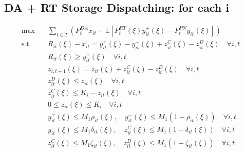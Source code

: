 \documentclass[10pt]{article}
\begin{document}
\newpage

\subsection{DA + RT Storage Dispatching: for each i}
\begin{subequations}
    \begin{align}
    \text{max} \quad &\sum_{t\in T}\left(P_t^{DA}x_{it} + \mathbb{E}\left[P_t^{RT}(\xi)y_{it}^{+}(\xi) - P_t^{PN}y_{it}^{-}(\xi)\right]\right)&\\    
    \text{s.t.} \quad &R_{it}(\xi) - x_{it} = y_{it}^{+}(\xi) - y_{it}^{-}(\xi) + z^C_{it}(\xi) - z^D_{it}(\xi)\quad  \forall i, t &\\ 
    &R_{it}(\xi) \geq y^+_{it}(\xi) \quad \forall i ,t &\\
    &z_{i,t+1}(\xi) = z_{it}(\xi) + z^C_{it}(\xi) - z^D_{it}(\xi) \quad \forall i, t &\\
    &z^D_{it}(\xi) \le z_{it}(\xi) \quad \forall i, t &\\
    &z^C_{it}(\xi) \le K_i-z_{it}(\xi) \quad \forall i, t &\\
    &0 \leq z_{it}(\xi) \leq K_i \quad \forall i, t &\\
    &y^+_{it}(\xi) \leq M_1 \rho_{it}(\xi), \quad y^-_{it}(\xi) \leq M_1 (1 - \rho_{it}(\xi)) \quad \forall i, t &\\
    &y^-_{it}(\xi) \leq M_1 \delta_{it}(\xi), \quad z^C_{it}(\xi) \leq M_1 (1 - \delta_{it}(\xi)) \quad \forall i, t &\\
    &z^C_{it}(\xi) \leq M_1 \zeta_{it}(\xi), \quad z^D_{it}(\xi) \leq M_1 (1 - \zeta_{it}(\xi)) \quad \forall i, t &
    \end{align}
\end{subequations}
\end{document}
